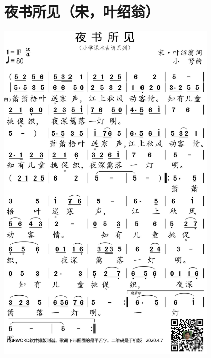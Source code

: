\documentclass[cn,pad,twocol]{elegantbook}
\begin{document}
\section{夜书所见（宋，叶绍翁）}
    \includegraphics[width=0.8\textwidth]{dongxiao/20200627-古诗-夜书所见.jpg}   
\end{document}
